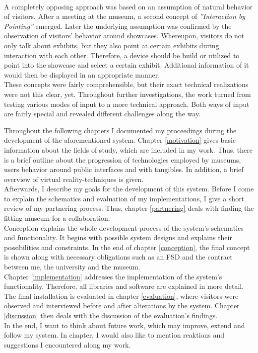 \\
A completely opposing approach was based on an assumption of natural behavior of visitors. After a meeting at the museum, a second concept of \textit{''Interaction by Pointing''} emerged. Later the underlying assumption was confirmed by the observation of visitors' behavior around showcases. Whereupon, visitors do not only talk about exhibits, but they also point at certain exhibits during interaction with each other. Therefore, a device should be build or utilized to point into the showcase and select a certain exhibit. Additional information of it would then be displayed in an appropriate manner. 
\\
These concepts were fairly comprehensible, but their exact technical realizations were not this clear, yet. Throughout further investigations, the work turned from testing various modes of input to a more technical approach. Both ways of input are fairly special and revealed different challenges along the way.


Throughout the following chapters I documented my proceedings during the development of the aforementioned system. Chapter \ref{motivation} gives basic information about the fields of study, which are included in my work. Thus, there is a brief outline about the progression of technologies employed by museums, users behavior around public interfaces and with tangibles. In addition, a brief overview of virtual reality-techniques is given.
\\
Afterwards, I describe my goals for the development of this system. Before I come to explain the schematics and evaluation of my implementations, I give a short review of my partnering process. Thus, chapter \ref{partnering} deals with finding the fitting museum for a collaboration. 
\\
Conception explains the whole development-process of the system's schematics and functionality. It begins with possible system designs and explains their possibilities and constraints. In the end of chapter \ref{conception}, the final concept is shown along with necessary obligations such as an \ac{FSD} and the contract between me, the university and the museum.
\\
Chapter \ref{implementation} addresses the implementation of the system's functionality. Therefore, all libraries and software are explained in more detail.
\\
The final installation is evaluated in chapter \ref{evaluation}, where visitors were observed and interviewed before and after alterations by the system. Chapter \ref{discussion} then deals with the discussion of the evaluation's findings.
\\
In the end, I want to think about future work, which may improve, extend and follow my system. In chapter, I would also like to mention reaktions and suggestions I encountered along my work.

